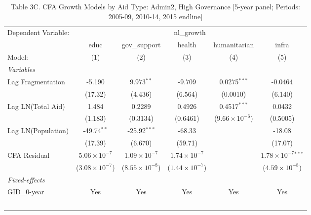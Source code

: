 
\begin{table}[H]
   \caption{Table 3C. CFA Growth Models by Aid Type: Admin2, High Governance [5-year panel; Periods: 2005-09, 2010-14, 2015 endline]}
   \centering
   \begin{tabular}{lccccc}
      \tabularnewline \midrule \midrule
      Dependent Variable: & \multicolumn{5}{c}{nl\_growth}\\
                         & educ                    & gov\_support            & health                  & humanitarian            & infra \\   
      Model:             & (1)                     & (2)                     & (3)                     & (4)                     & (5)\\  
      \midrule
      \emph{Variables}\\
      Lag Fragmentation  & -5.190                  & 9.973$^{**}$            & -9.709                  & 0.0275$^{***}$          & -0.0464\\   
                         & (17.32)                 & (4.436)                 & (6.564)                 & (0.0010)                & (6.140)\\   
      Lag LN(Total Aid)  & 1.484                   & 0.2289                  & 0.4926                  & 0.4517$^{***}$          & 0.0432\\   
                         & (1.183)                 & (0.3134)                & (0.6461)                & ($9.66\times 10^{-6}$)  & (0.5005)\\   
      Lag LN(Population) & -49.74$^{**}$           & -25.92$^{***}$          & -68.33                  &                         & -18.08\\   
                         & (17.39)                 & (6.670)                 & (59.71)                 &                         & (17.07)\\   
      CFA Residual       & $5.06\times 10^{-7}$    & $1.09\times 10^{-7}$    & $1.74\times 10^{-7}$    &                         & $1.78\times 10^{-7}$$^{***}$\\    
                         & ($3.08\times 10^{-7}$)  & ($8.55\times 10^{-8}$)  & ($1.44\times 10^{-7}$)  &                         & ($4.59\times 10^{-8}$)\\    
      \midrule
      \emph{Fixed-effects}\\
      GID\_0-year        & Yes                     & Yes                     & Yes                     & Yes                     & Yes\\  
$$
\end{tabular}
\end{table}

